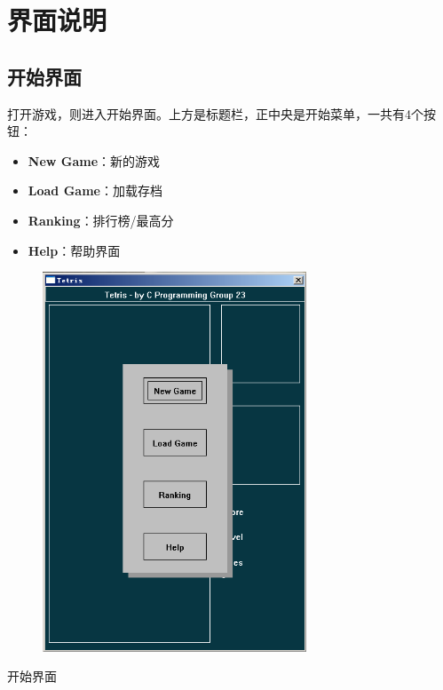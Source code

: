 \documentclass{style/ucasproposal}
\begin{document}


\tableofcontents

\clearpage
{}

\section{界面说明}
\subsection{开始界面}

打开游戏，则进入开始界面。上方是标题栏，正中央是开始菜单，一共有4个按钮：
\begin{itemize}
    \item \textbf{New Game}：新的游戏
    \item \textbf{Load Game}：加载存档
    \item \textbf{Ranking}：排行榜/最高分
    \item \textbf{Help}：帮助界面
\end{itemize}

\begin{center}
\begin{figure}[H]
\center
    \includegraphics[width=0.7\textwidth]{./img/manual/1-start.png}
\end{figure}
开始界面
\end{center}
\end{document}

